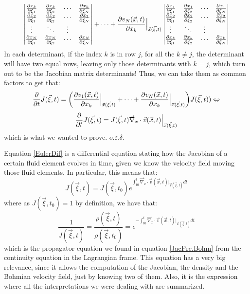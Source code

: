 \documentclass[11pt, a4paper]{article} %
\DeclareRobustCommand{\mybox}[2][gray!10]{%
\begin{tcolorbox}[   %
        left=0.2cm,
        right=0.2cm,
        top=0.15cm,
        bottom=0.15cm,
        colback=#1,
        colframe=#1,
        width=\dimexpr\textwidth\relax, 
        enlarge left by=0mm,
        boxsep=5pt,
        arc=0pt,outer arc=0pt,
        ]
        #2
\end{tcolorbox}
}
\begin{document}
{\begin{equation}
\begin{vmatrix}
\pdv{x_k}{\xi_{1}}&\pdv{x_k}{\xi_{2}} &\cdots &\pdv{x_k}{\xi_{N}}\\
\pdv{x_2}{\xi_{1}}&\pdv{x_2}{\xi_{2}} &\cdots &\pdv{x_2}{\xi_{N}}\\
\vdots & \ddots & \vdots\\
\pdv{x_N}{\xi_{1}}&\pdv{x_N}{\xi_{2}} &\cdots &\pdv{x_N}{\xi_{N}}
\end{vmatrix}+\cdots+
\pdv{v_N(\vec{x},t)}{x_k}\Big\rvert_{\vec{x}(\vec{\xi},t)} \begin{vmatrix}
\pdv{x_1}{\xi_{1}}&\pdv{x_1}{\xi_{2}} &\cdots &\pdv{x_1}{\xi_{N}}\\
\pdv{x_2}{\xi_{1}}&\pdv{x_2}{\xi_{2}} &\cdots &\pdv{x_2}{\xi_{N}}\\
\vdots & \ddots & \vdots\\
\pdv{x_k}{\xi_{1}}&\pdv{x_k}{\xi_{2}} &\cdots &\pdv{x_k}{\xi_{N}}
\end{vmatrix}
\end{equation}
In each determinant, if the index $k$ is in row $j$, for all the $k\neq j$, the determinant will have two equal rows, leaving only those determinants with $k=j$, which turn out to be the Jacobian matrix determinants! Thus, we can take them as common factors to get that:
\begin{equation}
\pdv{}{t}J(\vec{\xi},t)=\qty(\pdv{v_1(\vec{x},t)}{x_k}\Big\rvert_{\vec{x}(\vec{\xi},t)}+\cdots+\pdv{v_N(\vec{x},t)}{x_k}\Big\rvert_{\vec{x}(\vec{\xi},t)}) J(\vec{\xi},t))\Leftrightarrow
\end{equation}
\begin{equation}\label{EulerDif}
\pdv{}{t}J(\vec{\xi},t)=J(\vec{\xi},t)\vec{\nabla}_x\cdot\vec{v}(\vec{x},t)\Big\rvert_{\vec{x}(\vec{\xi},t)}
\end{equation}
which is what we wanted to prove. $o.\varepsilon.\delta$.}
\mybox{
Equation \eqref{EulerDif} is a differential equation stating how the Jacobian of a certain fluid element evolves in time, given we know the velocity field moving those fluid elements. In particular, this means that:\vspace{-0.2cm}
\begin{equation}
J(\vec{\xi},t)=J(\vec{\xi},t_0)e^{\int_{t0}^t \vec{\nabla}_x\cdot\vec{v}(\vec{x},t)\Big\rvert_{\vec{x}(\vec{\xi},t)}dt}
\end{equation}
where as $J(\vec{\xi},t_0)=1$ by definition, we have that:\vspace{-0.2cm}
\begin{equation}
\frac{1}{J(\vec{\xi},t)}=\frac{\rho(\vec{\xi},t)}{\rho(\vec{\xi},t_0)}=e^{-\int_{t0}^t \vec{\nabla}_x\cdot\vec{v}(\vec{x},t)\Big\rvert_{\vec{x}(\vec{\xi},t)}dt}
\end{equation}
which is the propagator equation we found in equation \eqref{JacPre.Bohm} from the continuity equation in the Lagrangian frame. This equation has a very big relevance, since it allows the computation of the Jacobian, the density and the Bohmian velocity field, just by knowing two of them. Also, it is the expression where all the interpretations we were dealing with are summarized.}
\end{document}
